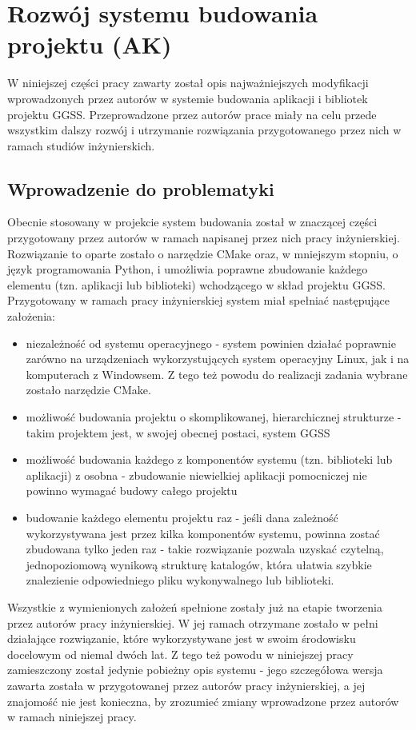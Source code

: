 \clearpage
\section{Rozwój systemu budowania projektu (AK)}
\label{ch:building_project}

W niniejszej części pracy zawarty został opis najważniejszych modyfikacji wprowadzonych przez autorów w systemie budowania aplikacji i bibliotek projektu GGSS. Przeprowadzone przez autorów prace miały na celu przede wszystkim dalszy rozwój i utrzymanie rozwiązania przygotowanego przez nich w ramach studiów inżynierskich.


\subsection{Wprowadzenie do problematyki}
Obecnie stosowany w projekcie system budowania został w znaczącej części przygotowany przez autorów w ramach napisanej przez nich pracy inżynierskiej. Rozwiązanie to oparte zostało o narzędzie CMake oraz, w mniejszym stopniu, o język programowania Python, i umożliwia poprawne zbudowanie każdego elementu (tzn. aplikacji lub biblioteki) wchodzącego w skład projektu GGSS. Przygotowany w ramach pracy inżynierskiej system miał spełniać następujące założenia:
\begin{itemize}
    \item niezależność od systemu operacyjnego - system powinien działać poprawnie zarówno na urządzeniach wykorzystujących system operacyjny Linux, jak i na komputerach z Windowsem. Z tego też powodu do realizacji zadania wybrane zostało narzędzie CMake.
    \item możliwość budowania projektu o skomplikowanej, hierarchicznej strukturze - takim projektem jest, w swojej obecnej postaci, system GGSS
    \item możliwość budowania każdego z komponentów systemu (tzn. biblioteki lub aplikacji) z osobna - zbudowanie niewielkiej aplikacji pomocniczej nie powinno wymagać budowy całego projektu
    \item budowanie każdego elementu projektu raz - jeśli dana zależność wykorzystywana jest przez kilka komponentów systemu, powinna zostać zbudowana tylko jeden raz - takie rozwiązanie pozwala uzyskać czytelną, jednopoziomową wynikową strukturę katalogów, która ułatwia szybkie znalezienie odpowiedniego pliku wykonywalnego lub biblioteki.
\end{itemize}
Wszystkie z wymienionych założeń spełnione zostały już na etapie tworzenia przez autorów pracy inżynierskiej. W jej ramach otrzymane zostało w pełni działające rozwiązanie, które wykorzystywane jest w swoim środowisku docelowym od niemal dwóch lat. Z tego też powodu w niniejszej pracy zamieszczony został jedynie pobieżny opis systemu - jego szczegółowa wersja zawarta została  w przygotowanej przez autorów pracy inżynierskiej, a jej znajomość nie jest konieczna, by zrozumieć zmiany wprowadzone przez autorów w ramach niniejszej pracy.


